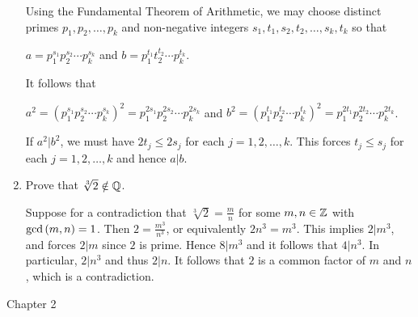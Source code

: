 \documentclass[11pt,fleqn,dvipsnames,usenames]{article}
\newcommand{\p}{\noindent}
\begin{document}
\begin{enumerate}
\solution Using the Fundamental Theorem of Arithmetic, we may choose distinct primes $p_{1},p_{2},\ldots, p_{k}$ and non-negative integers $s_{1},t_{1},s_{2},t_{2},\ldots,s_{k},t_{k}$ so that
\begin{center}
$a = p_{1}^{s_{1}}p_{2}^{s_{2}}\cdots p_{k}^{s_{k}}$ and $b = p_{1}^{t_{1}}t_{2}^{t_{2}}\cdots p_{k}^{t_{k}}$.
\end{center}
\p It follows that
\begin{center}
$a^2 = \left(p_{1}^{s_{1}}p_{2}^{s_{2}}\cdots p_{k}^{s_{k}}\right)^2 = p_{1}^{2s_{1}}p_{2}^{2s_{2}}\cdots p_{k}^{2s_{k}}$ and $b^2 = \left(p_{1}^{t_{1}}p_{2}^{t_{2}}\cdots p_{k}^{t_{k}}\right)^2 = p_{1}^{2t_{1}}p_{2}^{2t_{2}}\cdots p_{k}^{2t_{k}}$.
\end{center}
\p If $a^2|b^2$, we must have $2t_{j}\leq 2s_{j}$ for each $j=1,2,\ldots, k$.  This forces $t_{j}\leq s_{j}$ for each $j=1,2,\ldots, k$ and hence $a|b$.

\item Prove that $\sqrt[3]{2}\notin\mathbb{Q}$.
\vsmsp

\solution Suppose for a contradiction that $\sqrt[3]{2} = \frac{m}{n}$ for some $m,n\in\mathbb{Z}$ with $\text{gcd}\left(m,n\right)=1$.  Then $2 = \frac{m^3}{n^3}$, or equivalently $2n^3 = m^3$.  This implies $2|m^3$, and forces $2|m$ since $2$ is prime.  Hence $8|m^3$ and it follows that $4|n^3$.  In particular, $2|n^3$ and thus $2|n$.  It follows that $2$ is a common factor of $m$ and $n$, which is a contradiction.

\end{enumerate}
\vsp

{\huge Chapter 2}
\vsp
\end{document}
